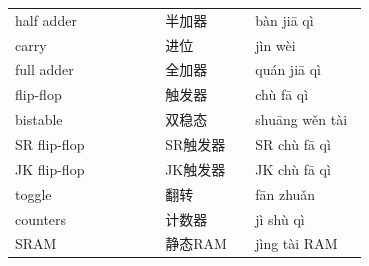 \documentclass[11pt]{article}
\begin{document}
\begin{longtable}{@{}p{0.40\linewidth}p{0.24\linewidth}p{0.30\linewidth}@{}}
half adder & 半加器 & bàn jiā qì \\
carry & 进位 & jìn wèi \\
full adder & 全加器 & quán jiā qì \\
flip-flop & 触发器 & chù fā qì \\
bistable & 双稳态 & shuāng wěn tài \\
SR flip-flop & SR触发器 & SR chù fā qì \\
JK flip-flop & JK触发器 & JK chù fā qì \\
toggle & 翻转 & fān zhuǎn \\
counters & 计数器 & jì shù qì \\
SRAM & 静态RAM & jìng tài RAM \\
\end{longtable}
\end{document}
